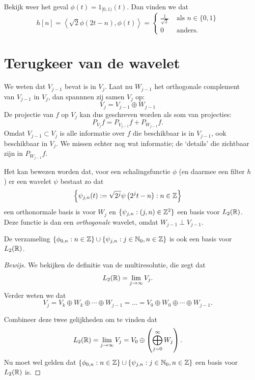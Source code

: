 \begin{voorbeeld}
  Bekijk weer het geval $\phi(t) = 1_{[0,1)}(t)$. Dan vinden we dat
    \[
    h[n] = \left\langle \sqrt{2} \phi\left(2t-n\right), \phi(t) \right\rangle = \begin{cases} \frac{1}{\sqrt{2}} & \text{ als } n \in \{0,1\} \\ 0 & \text{ anders.} \end{cases}
    \]
\end{voorbeeld}

\section{Terugkeer van de wavelet}
We weten dat $V_{j-1}$ bevat is in $V_{j}$. Laat nu $W_{j-1}$ het orthogonale complement van $V_{j-1}$ in $V_{j}$,
dan spannnen zij samen $V_j$ op:
\begin{equation}
  \label{ruimterec}
  V_{j} = V_{j-1} \oplus W_{j-1} 
\end{equation}
De projectie van $f$ op $V_{j}$ kan dus geschreven worden als som van projecties:
\begin{equation}
  \label{projectie_rec}
  P_{V_{j}} f = P_{V_{j-1}} f + P_{W_{j-1}} f.
\end{equation}
Omdat $V_{j-1} \subset V_{j}$ is alle informatie over $f$ die beschikbaar is in $V_{j-1}$, ook beschikbaar in $V_{j}$. 
We missen echter nog wat informatie; de `details' die zichtbaar zijn in $P_{W_{j-1}} f$.

Het kan bewezen worden \cite[T7.3]{mallat} dat, voor een schalingsfunctie $\phi$ (en daarmee een filter $h$) 
er een wavelet $\psi$ bestaat zo dat
\[
\left\{ \psi_{j,n}(t) := \sqrt{2^j} \psi\left(2^jt - n\right) : n \in \mathbb{Z} \right\}
\] 
een orthonormale basis is voor $W_j$ en $\{ \psi_{j,n}: (j,n) \in \mathbb{Z}^2 \}$ een basis voor $L_2(\mathbb{R})$. 
Deze functie is dan een \emph{orthogonale} wavelet, omdat $W_{j-1} \perp V_{j-1}$.

\begin{lemm}
\label{jarob}
De verzameling $\{ \phi_{0, n}: n \in \mathbb{Z} \} \cup \{ \psi_{j,n}: j \in \mathbb{N}_0, n \in \mathbb{Z} \}$ is ook een basis voor $L_2(\mathbb{R})$.
\end{lemm}

\begin{proof}[Bewijs]
We bekijken de definitie van de multiresolutie, die zegt dat
\[
	L_2(\mathbb{R}) = \lim_{j\to \infty}V_j.
\]
Verder weten we dat
\begin{equation}
  \label{ruimte_splitsing}
  V_j = V_k \oplus W_k \oplus \cdots \oplus W_{j-1} = \ldots
  = V_0 \oplus W_0 \oplus \cdots \oplus W_{j-1}.
\end{equation}

Combineer deze twee gelijkheden om te vinden dat
\[
	L_2(\mathbb{R}) = \lim_{j \to \infty} V_j = V_0 \oplus \left( \bigoplus_{j=0}^\infty W_j \right).
\]
Nu moet wel gelden dat $\{ \phi_{0, n}: n \in \mathbb{Z} \} \cup \{ \psi_{j,n}: j \in \mathbb{N}_0, n \in \mathbb{Z} \}$ een basis voor $L_2(\mathbb{R})$ is.
\end{proof}

